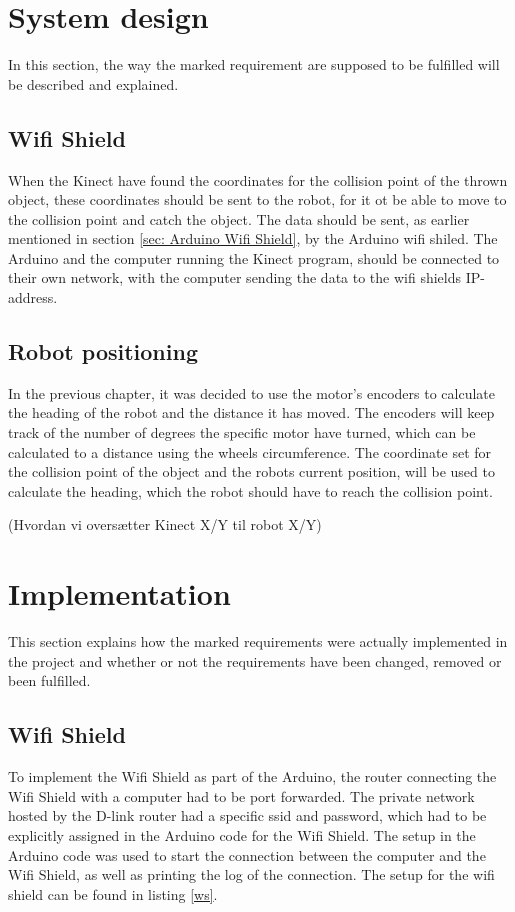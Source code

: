 \section{System design}
 \label{sec:i2System design} 
In this section, the way the marked requirement are supposed to be fulfilled will be described and explained.  

\subsection{Wifi Shield}
\label{sec:Wifi Shield SD}
When the Kinect have found the coordinates for the collision point of the thrown object, these coordinates should be sent to the robot, for it ot be able to move to the collision point and catch the object. 
The data should be sent, as earlier mentioned in section \ref{sec: Arduino Wifi Shield}, by the Arduino wifi shiled. The Arduino and the computer running the Kinect program, should be connected to their own network, with the computer sending the data to the wifi shields IP-address.

\subsection{Robot positioning}
\label{sec:Robot positioning System Design}
In the previous chapter, it was decided to use the motor's encoders to calculate the heading of the robot and the distance it has moved. The encoders will keep track of the number of degrees the specific motor have turned, which can be calculated to a distance using the wheels circumference.
The coordinate set for the collision point of the object and the robots current position, will be used to calculate the heading, which the robot should have to reach the collision point. 

(Hvordan vi oversætter Kinect X/Y til robot X/Y)

\section{Implementation}
\label{sec:i2Implementation}
This section explains how the marked requirements were actually implemented in the project and whether or not the requirements have been changed, removed or been fulfilled. 

\subsection{Wifi Shield}
\label{sec:Wifi Shield Implementation}
To implement the Wifi Shield as part of the Arduino, the router connecting the Wifi Shield with a computer had to be port forwarded. The private network hosted by the D-link router had a specific ssid and password, which had to be explicitly assigned in the Arduino code for the Wifi Shield. The setup in the Arduino code was used to start the connection between the computer and the Wifi Shield, as well as printing the log of the connection. The setup for the wifi shield can be found in listing \ref{ws}.

